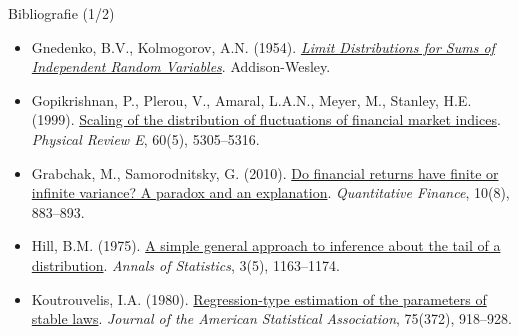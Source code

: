 \begin{frame}{Bibliografie (1/2)}
\begin{itemize}
    \item Gnedenko, B.V., Kolmogorov, A.N. (1954). \href{https://archive.org/details/limitdistributio00gned_0}{\textit{Limit Distributions for Sums of Independent Random Variables}}. Addison-Wesley.
    \item Gopikrishnan, P., Plerou, V., Amaral, L.A.N., Meyer, M., Stanley, H.E. (1999). \href{https://doi.org/10.1103/PhysRevE.60.5305}{Scaling of the distribution of fluctuations of financial market indices}. \textit{Physical Review E}, 60(5), 5305--5316.
    \item Grabchak, M., Samorodnitsky, G. (2010). \href{https://doi.org/10.1080/14697680903540381}{Do financial returns have finite or infinite variance? A paradox and an explanation}. \textit{Quantitative Finance}, 10(8), 883--893.
    \item Hill, B.M. (1975). \href{https://doi.org/10.1214/aos/1176343247}{A simple general approach to inference about the tail of a distribution}. \textit{Annals of Statistics}, 3(5), 1163--1174.
    \item Koutrouvelis, I.A. (1980). \href{https://doi.org/10.1080/01621459.1980.10477573}{Regression-type estimation of the parameters of stable laws}. \textit{Journal of the American Statistical Association}, 75(372), 918--928.
\end{itemize}
\end{frame}

